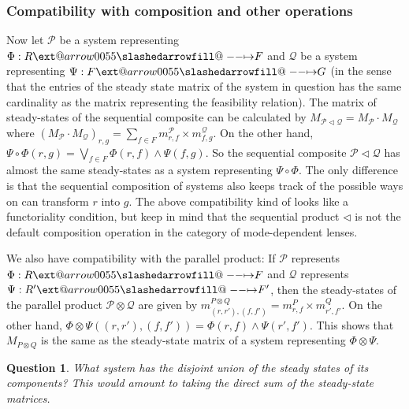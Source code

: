 \documentclass[12pt, a4paper]{article}
\makeatletter
\theoremstyle{definition}
\theoremstyle{plain}
\theoremstyle{plain}
\theoremstyle{plain}
\theoremstyle{plain}
\newtheorem{question}[counter]{Question}
\theoremstyle{plain}
\theoremstyle{remark}
\theoremstyle{remark}
\newcommand{\mc}[1]{\mathcal{#1}}
\def\slashedarrowfill@#1#2#3#4#5{%
	$\m@th\thickmuskip0mu\medmuskip\thickmuskip\thinmuskip\thickmuskip
	\relax#5#1\mkern-7mu%
	\cleaders\hbox{$#5\mkern-2mu#2\mkern-2mu$}\hfill
	\mathclap{#3}\mathclap{#2}%
	\cleaders\hbox{$#5\mkern-2mu#2\mkern-2mu$}\hfill
	\mkern-7mu#4$%
}
\def\rightslashedarrowfill@{%
	\slashedarrowfill@\relbar\relbar\mapstochar\rightarrow}
\newcommand\xslashedrightarrow[2][]{%
	\ext@arrow 0055{\rightslashedarrowfill@}{#1}{#2}}
\newcommand{\prof}{\xslashedrightarrow{}}
\makeatother
\begin{document}
\subsubsection{Compatibility with composition and other operations}
Now let $\mc{P}$ be a system representing $\Phi: R \prof F$ and $\mc{Q}$ be a system representing $\Psi: F \prof G$ (in the sense that the entries of the steady state matrix of the system in question has the same cardinality as the matrix representing the feasibility relation). The matrix of steady-states of the sequential composite can be calculated by $M_{\mc{P} \triangleleft \mc{Q}} = M_{\mc{P}} \cdot M_\mc{Q}$ where $(M_{\mc{P}} \cdot M_\mc{Q})_{r,g} = \sum_{f \in F} m^{\mc{P}}_{r,f} \times m^\mc{Q}_{f,g}$. On the other hand, $\Psi \circ \Phi (r,g) = \bigvee_{f \in F} \Phi(r,f) \wedge \Psi(f,g)$. So the sequential composite $\mc{P} \triangleleft \mc{Q}$ has almost the same steady-states as a system representing $\Psi \circ \Phi$. The only difference is that the sequential composition of systems also keeps track of the possible ways on can transform $r$ into $g$. The above compatibility kind of looks like a functoriality condition, but keep in mind that the sequential product $\triangleleft$ is not the default composition operation in the category of mode-dependent lenses.

We also have compatibility with the parallel product: If $\mc{P}$ represents $\Phi: R \prof F$ and $\mc{Q}$ represents $\Psi: R' \prof F'$, then the steady-states of the parallel product $\mc{P} \otimes \mc{Q}$ are given by $m^{P \otimes Q}_{(r,r'),(f,f')} = m^P_{r,f} \times m^Q_{r',f'}$. On the other hand, $\Phi \otimes \Psi ((r,r'),(f,f')) = \Phi(r,f) \wedge \Psi(r',f')$. This shows that $M_{P \otimes Q}$ is the same as the steady-state matrix of a system representing $\Phi \otimes \Psi$.

\begin{question}
	What system has the disjoint union of the steady states of its components? This would amount to taking the direct sum of the steady-state matrices.
\end{question}
\end{document}

